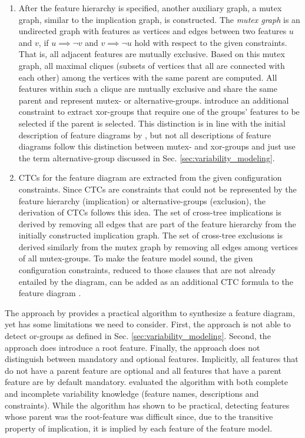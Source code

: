 \begin{enumerate}
  \item After the feature hierarchy is specified, another auxiliary graph, a
  mutex graph, similar to the implication graph, is constructed. The \emph{mutex
  graph} is an undirected graph with features as vertices and edges between two
  features $u$ and $v$, if $u \implies \neg{v}$ and $v \implies \neg{u}$ hold
  with respect to the given constraints. 
  That is, all adjacent features are mutually exclusive. Based on
  this mutex graph, all maximal cliques (subsets of vertices that all are
  connected with each other) among the vertices with the same parent are
  computed. All features within such a clique are mutually exclusive and share
  the same parent and represent mutex- or alternative-groups. \cite{she_reverse_2011} introduce an
  additional constraint to extract xor-groups that require one of the groups’
  features to be selected if the parent is selected. This distinction is in
  line with the initial description of feature diagrams by \cite{kang_feature-oriented_1990},
  but not all descriptions of feature diagrams follow this distinction between
  mutex- and xor-groups and just use the term alternative-group discussed in 
  Sec. \ref{sec:variability_modeling}. %
  
  \item CTCs for the feature diagram are extracted from
  the given configuration constraints. Since CTCs are constraints that could
  not be represented by the feature hierarchy (implication) or
  alternative-groups (exclusion), the derivation of CTCs follows this idea. The
  set of cross-tree implications is derived by removing all edges that are part
  of the feature hierarchy from the initially constructed implication graph.
  The set of cross-tree exclusions is derived similarly from the mutex
  graph by removing all edges among vertices of all mutex-groups. To make the
  feature model sound, the given configuration constraints, reduced to those
  clauses that are not already entailed by the diagram, can be added as an
  additional CTC formula to the feature diagram \citep{she_reverse_2011}.
\end{enumerate}

The approach by \cite{she_reverse_2011} provides a practical algorithm to synthesize a
feature diagram, yet has some limitations we need to consider. First, the
approach is not able to detect or-groups as defined in Sec. \ref{sec:variability_modeling}.
Second, the approach does introduce a root feature. Finally, the approach does not
distinguish between mandatory and optional features. Implicitly, all features
that do not have a parent feature are optional and all features that have a
parent feature are by default mandatory. \cite{she_reverse_2011} evaluated the
algorithm with both complete and incomplete variability knowledge (feature
names, descriptions and constraints). While the algorithm has shown to be
practical, detecting features whose parent was the root-feature was difficult
since, due to the transitive property of implication, it is implied by each
feature of the feature model.


